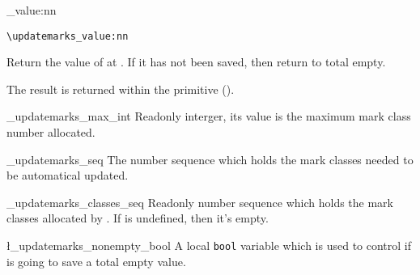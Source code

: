 \documentclass{l3doc}
\begin{document}
\begin{function}[EXP]{\updatemarks_value:nn}
  \begin{syntax}
    \verb|\updatemarks_value:nn|  
  \end{syntax}
Return the value of  at .
If it has not been saved, then return to total empty.

\begin{texnote}
  The result is returned within the  primitive ().
\end{texnote}
\end{function}

\begin{function}{\g_updatemarks_max_int}
Readonly interger, its value is the maximum mark class number allocated.
\end{function}

\begin{function}{\g_updatemarks_seq}
The number sequence which holds the mark classes needed to be automatical updated.
\end{function}

\begin{function}{\g_updatemarks_classes_seq}
Readonly number sequence which holds the mark classes allocated by 
. If  is undefined, then it's empty.
\end{function}

\begin{function}{\l_updatemarks_nonempty_bool}
A local \texttt{bool} variable which is used to control if is going to save 
a total empty value.
\end{function}
\end{document}
